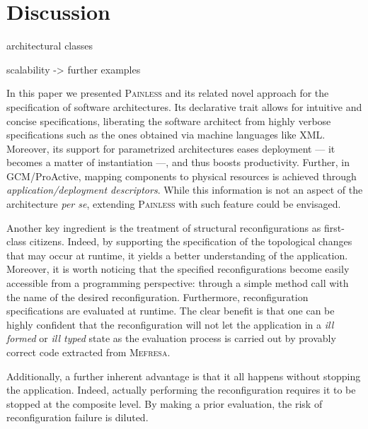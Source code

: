 \section{Discussion}
\label{sec:painlessdiscussion}

architectural classes

scalability -> further examples


In this paper we presented \textsc{Painless} and its related novel approach for the
 specification of software architectures. Its declarative trait allows for intuitive
 and concise specifications, liberating the software architect from 
 highly verbose specifications such as the ones obtained via 
 machine languages like XML. Moreover, its support for parametrized 
 architectures eases deployment --- it becomes a 
 matter of instantiation ---, and thus boosts productivity. Further,
 in GCM/ProActive, mapping components to physical resources 
 is achieved through \textit{application/deployment descriptors}. 
 While this information is not an aspect
 of the architecture \textit{per se}, extending \textsc{Painless}
 with such feature could be envisaged.
 
 
 	Another key ingredient is the treatment
 of structural reconfigurations as first-class citizens. Indeed, by supporting
 the specification of the topological changes that may occur at runtime,
 it yields a better understanding of the application. Moreover, it is worth noticing
 that the specified reconfigurations become easily accessible from a programming 
 perspective: through a simple method call with the name of the desired reconfiguration.
 Furthermore, reconfiguration specifications are evaluated	 at runtime.
 The clear benefit is that one can be highly confident that the reconfiguration will
 not let the application in a \textit{ill formed} or \textit{ill typed} state as
 the evaluation process is carried out by provably correct code extracted from
 \textsc{Mefresa}.
 
 Additionally,  a further inherent advantage is that it all happens without 
 stopping the application. Indeed, actually performing the
 reconfiguration requires it to be stopped at the composite level.
 By making a prior evaluation, the risk of reconfiguration 
 failure is diluted. 
 

  

